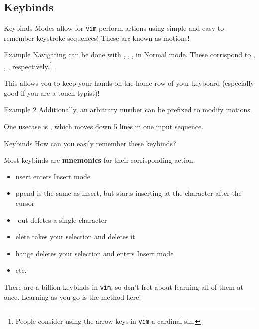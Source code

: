 \documentclass{beamer}
\begin{document}
\subsection{Keybinds}
\begin{frame}{Keybinds}
	Modes allow for \texttt{vim} perform actions using simple and easy to
	remember keystroke sequences! \pause These are known as motions!
	\pause

	\begin{exampleblock}{Example}
		Navigating can be done with , , ,
		 in Normal mode. These corrispond to \keys{\arrowkeyleft},
		\keys{\arrowkeydown}, \keys{\arrowkeyup}, \keys{\arrowkeyright}
		respectively.\footnote{People consider using the arrow keys in
		\texttt{vim} a cardinal sin.}
		\pause

		This allows you to keep your hands on the home-row of your
		keyboard (especially good if you are a touch-typist)!
	\end{exampleblock}
	\pause

	\begin{exampleblock}{Example 2}
		Additionally, an arbitrary number can be prefixed to
		\underline{modify} motions.
		\pause

		One usecase is , which moves down 5 lines in one
		input sequence.
	\end{exampleblock}
\end{frame}

\begin{frame}{Keybinds}
	How can you easily remember these keybinds?
	\pause

	Most keybinds are \textbf{mnemonics} for their corrisponding action.
	\begin{itemize}
		\item {}nsert enters Insert mode
		\item {}ppend is the same as insert, but starts
			inserting at the character after the cursor
		\item {}-out deletes a single character
		\item {}elete takes your selection and deletes it
		\item {}hange deletes your selection and enters Insert
			mode
		\item etc.
	\end{itemize}
	\pause

	There are a billion keybinds in \texttt{vim}, so don't fret about
	learning all of them at once. Learning as you go is the method here!
\end{frame}
\end{document}
